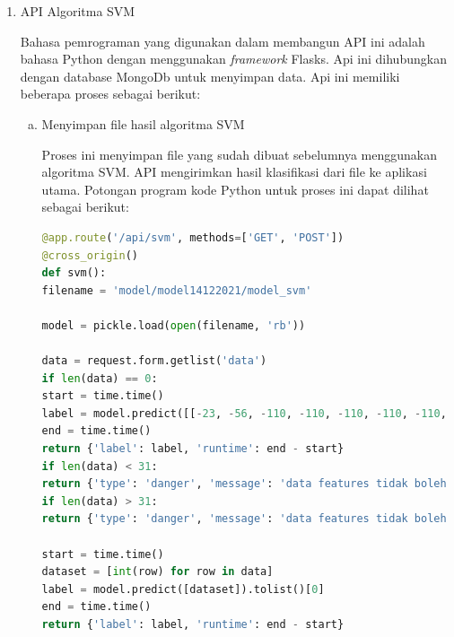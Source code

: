 \begin{enumerate}[1.]
	\item API Algoritma SVM
	      \par Bahasa pemrograman yang digunakan dalam membangun API ini adalah bahasa Python dengan menggunakan \textit{framework} Flasks.  Api ini dihubungkan dengan database MongoDb untuk menyimpan data. Api ini memiliki beberapa proses sebagai berikut:
	      \begin{enumerate}[a.]
		      \item Menyimpan file hasil algoritma SVM
		            \par Proses ini menyimpan file yang sudah dibuat sebelumnya menggunakan algoritma SVM. API mengirimkan hasil klasifikasi dari file ke aplikasi utama. Potongan program kode Python untuk proses ini dapat dilihat sebagai berikut:
		            \begin{lstlisting}[language=Python]
@app.route('/api/svm', methods=['GET', 'POST'])
@cross_origin()
def svm():
filename = 'model/model14122021/model_svm'
						
model = pickle.load(open(filename, 'rb'))
						
data = request.form.getlist('data')
if len(data) == 0:
start = time.time()
label = model.predict([[-23, -56, -110, -110, -110, -110, -110, -110, -110, -110, -110, -96,	-100,	-97,	-90,	-90,	-93,	-89,	-95,	-95, -85,	-78,	-95,	-95,	-88, -95,	-110,	-110,	-110,	-110,	-110]]).tolist()[0]
end = time.time()
return {'label': label, 'runtime': end - start}
if len(data) < 31:
return {'type': 'danger', 'message': 'data features tidak boleh dibawah 20'}
if len(data) > 31:
return {'type': 'danger', 'message': 'data features tidak boleh di atas 20'}	

start = time.time()
dataset = [int(row) for row in data]
label = model.predict([dataset]).tolist()[0]
end = time.time()
return {'label': label, 'runtime': end - start}				
								\end{lstlisting}


\end{enumerate}
\end{enumerate}
